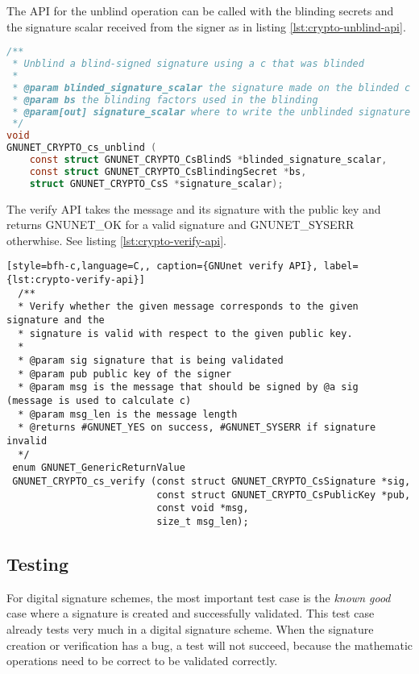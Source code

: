 The API for the unblind operation can be called with the blinding secrets and the signature scalar received from the signer as in listing \ref{lst:crypto-unblind-api}.

\begin{lstlisting}[style=bfh-c,language=C, caption={GNUnet unblind API}, label={lst:crypto-unblind-api}]
  /**
 * Unblind a blind-signed signature using a c that was blinded
 *
 * @param blinded_signature_scalar the signature made on the blinded c
 * @param bs the blinding factors used in the blinding
 * @param[out] signature_scalar where to write the unblinded signature
 */
void
GNUNET_CRYPTO_cs_unblind (
    const struct GNUNET_CRYPTO_CsBlindS *blinded_signature_scalar,
    const struct GNUNET_CRYPTO_CsBlindingSecret *bs,
    struct GNUNET_CRYPTO_CsS *signature_scalar);
\end{lstlisting}

The verify API takes the message and its signature with the public key and returns GNUNET\_OK for a valid signature and GNUNET\_SYSERR otherwhise.
See listing \ref{lst:crypto-verify-api}.

\begin{lstlisting}[style=bfh-c,language=C,, caption={GNUnet verify API}, label={lst:crypto-verify-api}]
  /**
  * Verify whether the given message corresponds to the given signature and the
  * signature is valid with respect to the given public key.
  *
  * @param sig signature that is being validated
  * @param pub public key of the signer
  * @param msg is the message that should be signed by @a sig  (message is used to calculate c)
  * @param msg_len is the message length
  * @returns #GNUNET_YES on success, #GNUNET_SYSERR if signature invalid
  */
 enum GNUNET_GenericReturnValue
 GNUNET_CRYPTO_cs_verify (const struct GNUNET_CRYPTO_CsSignature *sig,
                          const struct GNUNET_CRYPTO_CsPublicKey *pub,
                          const void *msg,
                          size_t msg_len);
\end{lstlisting}

\subsection{Testing}
For digital signature schemes, the most important test case is the \textit{known good} case where a signature is created and successfully validated.
This test case already tests very much in a digital signature scheme.
When the signature creation or verification has a bug, a test will not succeed, because the mathematic operations need to be correct to be validated correctly.

